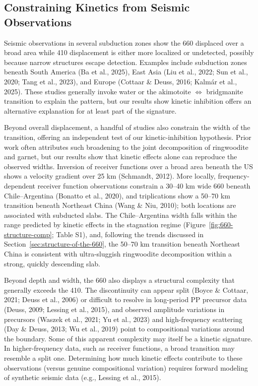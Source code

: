 \documentclass[draft,linenumbers]{agujournal2019}
\begin{document}
\subsection{Constraining Kinetics from Seismic
Observations}\label{sec:constraining-kinetics-from-seismic-observations}

Seismic observations in several subduction zones show the 660 displaced
over a broad area while 410 displacement is either more localized or
undetected, possibly because narrow structures escape detection.
Examples include subduction zones beneath South America (Ba et al.,
2025), East Asia (Liu et al., 2022; Sun et al., 2020; Tang et al.,
2023), and Europe (Cottaar \& Deuss, 2016; Kalmár et al., 2025). These
studies generally invoke water or the akimotoite \(\Leftrightarrow\)
bridgmanite transition to explain the pattern, but our results show
kinetic inhibition offers an alternative explanation for at least part
of the signature.

Beyond overall displacement, a handful of studies also constrain the
width of the transition, offering an independent test of our
kinetic-inhibition hypothesis. Prior work often attributes such
broadening to the joint decomposition of ringwoodite and garnet, but our
results show that kinetic effects alone can reproduce the observed
widths. Inversion of receiver functions over a broad area beneath the US
shows a velocity gradient over 25 km (Schmandt, 2012). More locally,
frequency-dependent receiver function observations constrain a 30--40 km
wide 660 beneath Chile--Argentina (Bonatto et al., 2020), and
triplications show a 50--70 km transition beneath Northeast China (Wang
\& Niu, 2010); both locations are associated with subducted slabs. The
Chile--Argentina width falls within the range predicted by kinetic
effects in the stagnation regime (Figure~\ref{fig:660-structure-comp};
Table S1), and, following the trends discussed in
Section~\ref{sec:structure-of-the-660}, the 50--70 km transition beneath
Northeast China is consistent with ultra-sluggish ringwoodite
decomposition within a strong, quickly descending slab.

Beyond depth and width, the 660 also displays a structural complexity
that generally exceeds the 410. The discontinuity can appear split
(Boyce \& Cottaar, 2021; Deuss et al., 2006) or difficult to resolve in
long-period PP precursor data (Deuss, 2009; Lessing et al., 2015), and
observed amplitude variations in precursors (Waszek et al., 2021; {Yu et
al.}, 2023) and high-frequency scattering (Day \& Deuss, 2013; Wu et
al., 2019) point to compositional variations around the boundary. Some
of this apparent complexity may itself be a kinetic signature. In
higher-frequency data, such as receiver functions, a broad transition
may resemble a split one. Determining how much kinetic effects
contribute to these observations (versus genuine compositional
variation) requires forward modeling of synthetic seismic data (e.g.,
Lessing et al., 2015).
\end{document}
